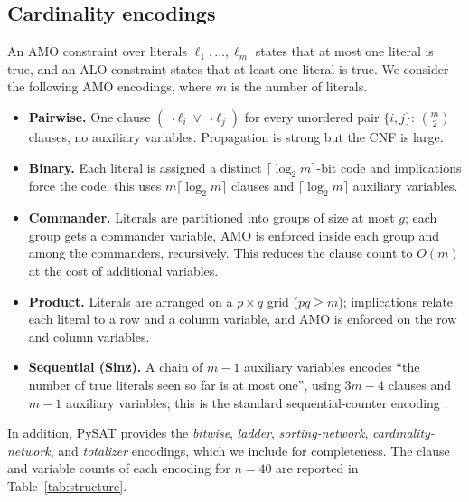 \documentclass[a4paper,fleqn]{cas-sc}
\begin{document}
\subsection{Cardinality encodings}
An AMO constraint over literals $\ell_1,\dots,\ell_m$ states that at most one
literal is true, and an ALO constraint states that at least one literal is true.
We consider the following AMO encodings, where $m$ is the number of literals.
\begin{itemize}
  \item \textbf{Pairwise.} One clause $(\neg \ell_i \vee \neg \ell_j)$ for every
        unordered pair $\{i,j\}$: $\binom{m}{2}$ clauses, no auxiliary
        variables. Propagation is strong but the CNF is large.
  \item \textbf{Binary.} Each literal is assigned a distinct $\lceil \log_2 m
        \rceil$-bit code and implications force the code; this uses
        $m\lceil\log_2 m\rceil$ clauses and $\lceil\log_2 m\rceil$ auxiliary
        variables.
  \item \textbf{Commander.} Literals are partitioned into groups of size at most
        $g$; each group gets a commander variable, AMO is enforced inside each
        group and among the commanders, recursively. This reduces the clause
        count to $O(m)$ at the cost of additional variables.
  \item \textbf{Product.} Literals are arranged on a $p\times q$ grid ($pq \geq
        m$); implications relate each literal to a row and a column variable, and
        AMO is enforced on the row and column variables.
  \item \textbf{Sequential (Sinz).} A chain of $m-1$ auxiliary variables encodes
        ``the number of true literals seen so far is at most one'', using
        $3m-4$ clauses and $m-1$ auxiliary variables; this is the standard
        sequential-counter encoding \citep{Sinz2005}.
\end{itemize}
In addition, PySAT \citep{Ignatiev2018} provides the \emph{bitwise},
\emph{ladder}, \emph{sorting-network}, \emph{cardinality-network}, and
\emph{totalizer} encodings, which we include for completeness. The clause and
variable counts of each encoding for $n=40$ are reported in
Table~\ref{tab:structure}.
\end{document}
